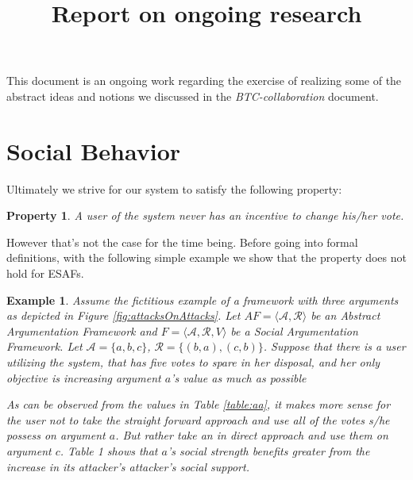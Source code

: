 \documentclass{article}
\date{ }
\newtheorem{property}{Property}
\newtheorem{example}{Example}
\newcommand{\args}{\mathcal{A}} %
\newcommand{\att}{\mathcal{R}}  %
\newcommand{\safid}{F}               %
\newcommand{\oldsaf}{\safid = \oldsafbody} %
\newcommand{\oldsafbody}{\langle \args, \att, V \rangle} %
\newcommand{\afit}{\textit{AF}}
\newcommand{\af}{\afit = \langle \args, \att \rangle}
\begin{document}
\title{Report on ongoing research}

\maketitle

This document is an ongoing work regarding the exercise of realizing some of the abstract ideas and notions we discussed in the \emph{BTC-collaboration} document.




\section{Social Behavior}

Ultimately we strive for our system to satisfy the following property:

\begin{property}
\label{uc}
A user of the system never has an incentive to change his/her vote.
\end{property}

However that's not the case for the time being. Before going into formal definitions, with the following simple example we show that the property does not hold for ESAFs.


\begin{example}
Assume the fictitious example of a framework with three arguments as depicted in Figure \ref{fig:attacksOnAttacks}. Let $\af$ be an Abstract Argumentation Framework and $\oldsaf$ be a Social Argumentation Framework. Let  $\args = \{a, b, c\}$, $\att = \{(b,a), (c,b)\}$.
Suppose that there is a user utilizing the system, that has five votes to spare in her disposal, and her only objective is increasing argument $a$'s value as much as possible

As can be observed from the values in Table \ref{table:aa}, it makes more sense for the user not to take the straight forward approach and use all of the votes s/he possess on argument $a$. But rather take an in direct approach and use them on argument $c$. Table 1 shows that $a$'s social strength benefits greater from the increase in its attacker's attacker's social support.



\end{example}
\end{document}
